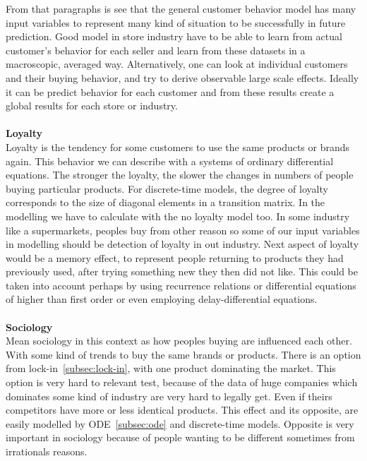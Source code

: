From that paragraphs is see that the general customer behavior model has many input variables to represent many kind
of situation to be successfully in future prediction.
Good model in store industry have to be able to learn from actual customer's behavior for each seller and learn
from these datasets in a macroscopic, averaged way.
Alternatively, one can look at individual customers and their buying behavior, and try to derive observable large scale effects.
Ideally it can be predict behavior for each customer and from these results create a global results for each store or industry.\\
\\
\textbf{Loyalty} \label{subsec:loyalty}\\
Loyalty is the tendency for some customers to use the same products or brands again.
This behavior we can describe with a systems of ordinary differential equations.
The stronger the loyalty, the slower the changes in numbers of people buying particular products.
For discrete-time models, the degree of loyalty corresponds to the size of diagonal elements in a transition matrix.
In the modelling we have to calculate with the no loyalty model too.
In some industry like a supermarkets, peoples buy from other reason so some of our input variables in modelling should be
detection of loyalty in out industry.
Next aspect of loyalty would be a memory effect, to represent people returning to products they had previously used,
after trying something new they then did not like.
This could be taken into account perhaps by using recurrence relations or differential equations of higher than first order or even employing
delay-differential equations.\\
\\
\textbf{Sociology} \label{subsec:sociology}\\
Mean sociology in this context as how peoples buying are influenced each other.
With some kind of trends to buy the same brands or products.
There is an option from lock-in~\ref{subsec:lock-in}, with one product dominating the market.
This option is very hard to relevant test, because of the data of huge companies which dominates some kind
of industry are very hard to legally get.
Even if theirs competitors have more or less identical products.
This effect and its opposite, are easily modelled by ODE~\ref{subsec:ode} and discrete-time models.
Opposite is very important in sociology because of people wanting to be different sometimes from irrationals reasons.

